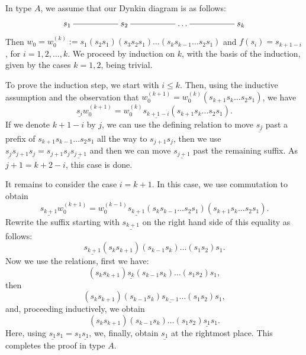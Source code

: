 \documentclass[a4paper]{amsart}
\begin{document}
In type $A$, we assume that our Dynkin diagram is as follows:
\begin{displaymath}
\xymatrix{s_1\ar@{-}[rr]&&s_2\ar@{-}[rr]&&\dots\ar@{-}[rr]&&s_k} 
\end{displaymath}
Then $w_0=w_0^{(k)}:=s_1(s_2s_1)(s_3s_2s_1)\dots (s_ks_{k-1}\dots s_2s_1)$
and $f(s_i)=s_{k+1-i}$, for $i=1,2,\dots,k$. We proceed by induction 
on $k$, with the basis of the induction, given by the cases $k=1,2$, 
being trivial.

To prove the induction step, we start with $i\leq k$. Then, using the
inductive assumption and the observation that 
$w_0^{(k+1)}=w_0^{(k)}(s_{k+1}s_{k}\dots s_2s_1)$, we have
\begin{displaymath}
\underline{s_i}w_0^{(k+1)}=
w_0^{(k)}\underline{s_{k+1-i}}(s_{k+1}s_{k}\dots s_2s_1).
\end{displaymath}
If we denote $k+1-i$ by $j$, we can use the defining relation to move
$\underline{s_{j}}$ past a prefix of $s_{k+1}s_{k-1}\dots s_2s_1$
all the way to $s_{j+1}s_j$, then we use
$\underline{s_{j}}s_{j+1}s_j=s_{j+1}s_j\underline{s_{j+1}}$
and then we can move $\underline{s_{j+1}}$ past the remaining suffix.
As $j+1=k+2-i$, this case is done.

It remains to consider the case $i=k+1$. In this case, we use
commutation to obtain 
\begin{displaymath}
\underline{s_{k+1}}w_0^{(k+1)}=
w_0^{(k-1)}\underline{s_{k+1}}(s_{k}s_{k-1}\dots s_2s_1)(s_{k+1}s_{k}\dots s_2s_1).
\end{displaymath}
Rewrite the suffix starting with 
$\underline{s_{k+1}}$ on the right hand side of this equality as follows:
\begin{equation}\label{eq-nm3}
\underline{s_{k+1}}(s_{k}s_{k+1})(s_{k-1}s_k)\dots (s_1s_2)s_1.
\end{equation}
Now we use the relations, first we have:
\begin{displaymath}
(s_{k}s_{k+1})\underline{s_{k}}(s_{k-1}s_k)\dots (s_1s_2)s_1,
\end{displaymath}
then
\begin{displaymath}
(s_{k}s_{k+1})(s_{k-1}s_k)\underline{s_{k-1}}\dots (s_1s_2)s_1,
\end{displaymath}
and, proceeding inductively, we obtain
\begin{displaymath}
(s_{k}s_{k+1})(s_{k-1}s_k)\dots (s_1s_2)\underline{s_{1}}s_1.
\end{displaymath}
Here, using $\underline{s_{1}}s_1=s_1\underline{s_{1}}$,
we, finally,  obtain $\underline{s_{1}}$ at the rightmost place.
This completes the proof in type $A$.
\end{document}
